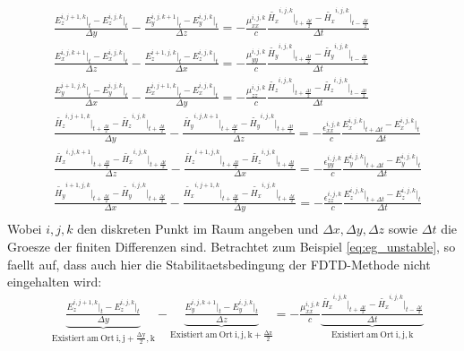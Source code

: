 \documentclass[11pt, ngerman]{article}
\begin{document}
\begin{align}
	&\frac{E_z^{i,j+1,k}\vert_t - E_z^{i,j,k}\vert_t}{\Delta y} - \frac{E_y^{i,j,k+1}\vert_t - E_y^{i,j,k}\vert_t}{\Delta z}
	= -\frac{\mu_{xx}^{i,j,k}}{c}\frac{\widetilde{H_x}^{i,j,k}\vert_{t+\frac{\Delta t}{2}} - \widetilde{H_x}^{i,j,k}\vert_{t-\frac{\Delta t}{2}}}{\Delta t}\label{eq:eg_unstable}\\
	&\frac{E_x^{i,j,k+1}\vert_t - E_x^{i,j,k}\vert_t}{\Delta z} - \frac{E_z^{i+1,j,k}\vert_t - E_z^{i,j,k}\vert_t}{\Delta x}
	= -\frac{\mu_{yy}^{i,j,k}}{c}\frac{\widetilde{H_y}^{i,j,k}\vert_{t+\frac{\Delta t}{2}} - \widetilde{H_y}^{i,j,k}\vert_{t-\frac{\Delta t}{2}}}{\Delta t}\\
	&\frac{E_y^{i+1,j,k}\vert_t - E_y^{i,j,k}\vert_t}{\Delta x} - \frac{E_x^{i,j+1,k}\vert_t - E_x^{i,j,k}\vert_t}{\Delta y}
	= -\frac{\mu_{zz}^{i,j,k}}{c}\frac{\widetilde{H_z}^{i,j,k}\vert_{t+\frac{\Delta t}{2}} - \widetilde{H_z}^{i,j,k}\vert_{t-\frac{\Delta t}{2}}}{\Delta t}\\
	&\frac{\widetilde{H_z}^{i,j+1,k}\vert_{t+\frac{\Delta t}{2}} - \widetilde{H_z}^{i,j,k}\vert_{t+\frac{\Delta t}{2}}}{\Delta y}
	- \frac{\widetilde{H_y}^{i,j,k+1}\vert_{t+\frac{\Delta t}{2}} - \widetilde{H_y}^{i,j,k}\vert_{t+\frac{\Delta t}{2}}}{\Delta z}
	= -\frac{\epsilon_{xx}^{i,j,k}}{c}\frac{E_x^{i,j,k}\vert_{t+\Delta t} - E_x^{i,j,k}\vert_t}{\Delta t}\\
	&\frac{\widetilde{H_x}^{i,j,k+1}\vert_{t+\frac{\Delta t}{2}} - \widetilde{H_x}^{i,j,k}\vert_{t+\frac{\Delta t}{2}}}{\Delta z}
	- \frac{\widetilde{H_z}^{i+1,j,k}\vert_{t+\frac{\Delta t}{2}} - \widetilde{H_z}^{i,j,k}\vert_{t+\frac{\Delta t}{2}}}{\Delta x}
	= -\frac{\epsilon_{yy}^{i,j,k}}{c}\frac{E_y^{i,j,k}\vert_{t+\Delta t} - E_y^{i,j,k}\vert_t}{\Delta t}\\
	&\frac{\widetilde{H_y}^{i+1,j,k}\vert_{t+\frac{\Delta t}{2}} - \widetilde{H_y}^{i,j,k}\vert_{t+\frac{\Delta t}{2}}}{\Delta x}
	- \frac{\widetilde{H_x}^{i,j+1,k}\vert_{t+\frac{\Delta t}{2}} - \widetilde{H_x}^{i,j,k}\vert_{t+\frac{\Delta t}{2}}}{\Delta y}
	= -\frac{\epsilon_{zz}^{i,j,k}}{c}\frac{E_z^{i,j,k}\vert_{t+\Delta t} - E_z^{i,j,k}\vert_t}{\Delta t}\\
\end{align}
Wobei \(i,j,k\) den diskreten Punkt im Raum angeben und \(\Delta x, \Delta y, \Delta z\) sowie \(\Delta t\) die Groesze der finiten Differenzen sind.
Betrachtet zum Beispiel \cref{eq:eg_unstable}, so faellt auf, dass auch hier die Stabilitaetsbedingung der FDTD-Methode nicht eingehalten wird:
\begin{align}
	&\underbrace{\frac{E_z^{i,j+1,k}\vert_t - E_z^{i,j,k}\vert_t}{\Delta y}}_{\mathrm{Existiert\ am\ Ort\ i,j+\frac{\Delta y}{2},k}}
	-\underbrace{\frac{E_y^{i,j,k+1}\vert_t - E_y^{i,j,k}\vert_t}{\Delta z}}_{\mathrm{Existiert\ am\ Ort\ i,j,k+\frac{\Delta z}{2}}}
	= -\frac{\mu_{xx}^{i,j,k}}{c}
	\underbrace{\frac{\widetilde{H_x}^{i,j,k}\vert_{t+\frac{\Delta t}{2}} - \widetilde{H_x}^{i,j,k}\vert_{t-\frac{\Delta t}{2}}}{\Delta t}}_{\mathrm{Existiert\ am\ Ort\ i,j,k}}
\end{align}
\end{document}
